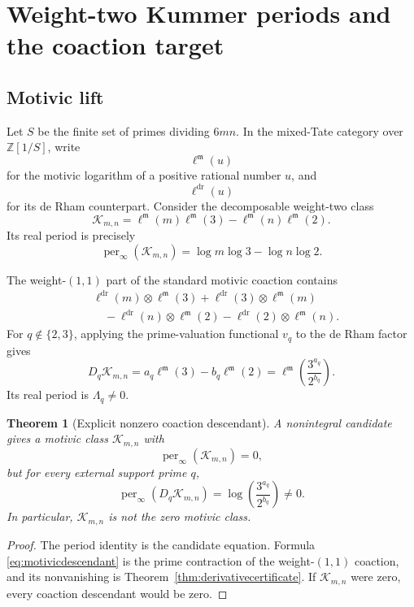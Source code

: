 \documentclass[11pt,oneside]{article}
\newtheorem{theorem}{Theorem}[section]
\theoremstyle{definition}
\newcommand{\Z}{\mathbb Z}
\newcommand{\per}{\operatorname{per}}
\begin{document}
\section{Weight-two Kummer periods and the coaction target}

\subsection{Motivic lift}

Let $S$ be the finite set of primes dividing $6mn$.  In the mixed-Tate category over $\Z[1/S]$, write
\[
  \ell^{\mathfrak m}(u)
\]
for the motivic logarithm of a positive rational number $u$, and
\[
  \ell^{\mathrm{dr}}(u)
\]
for its de Rham counterpart.  Consider the decomposable weight-two class
\begin{equation}\label{eq:motivicclass}
 \mathcal K_{m,n}
 =\ell^{\mathfrak m}(m)\ell^{\mathfrak m}(3)
  -\ell^{\mathfrak m}(n)\ell^{\mathfrak m}(2).
\end{equation}
Its real period is precisely
\[
  \per_\infty(\mathcal K_{m,n})
  =\log m\log3-\log n\log2.
\]

The weight-$(1,1)$ part of the standard motivic coaction contains
\begin{align*}
 &\ell^{\mathrm{dr}}(m)\otimes\ell^{\mathfrak m}(3)
 +\ell^{\mathrm{dr}}(3)\otimes\ell^{\mathfrak m}(m)\\
 &\quad-
 \ell^{\mathrm{dr}}(n)\otimes\ell^{\mathfrak m}(2)
 -\ell^{\mathrm{dr}}(2)\otimes\ell^{\mathfrak m}(n).
\end{align*}
For $q\notin\{2,3\}$, applying the prime-valuation functional $v_q$ to the de Rham factor gives
\begin{equation}\label{eq:motivicdescendant}
 D_q\mathcal K_{m,n}
 =a_q\ell^{\mathfrak m}(3)-b_q\ell^{\mathfrak m}(2)
 =\ell^{\mathfrak m}\!\left(\frac{3^{a_q}}{2^{b_q}}\right).
\end{equation}
Its real period is $\Lambda_q\ne0$.

\begin{theorem}[Explicit nonzero coaction descendant]
A nonintegral candidate gives a motivic class $\mathcal K_{m,n}$ with
\[
 \per_\infty(\mathcal K_{m,n})=0,
\]
but for every external support prime $q$,
\[
 \per_\infty(D_q\mathcal K_{m,n})
 =\log\!\left(\frac{3^{a_q}}{2^{b_q}}\right)\ne0.
\]
In particular, $\mathcal K_{m,n}$ is not the zero motivic class.
\end{theorem}

\begin{proof}
The period identity is the candidate equation.  Formula \eqref{eq:motivicdescendant} is the prime contraction of the weight-$(1,1)$ coaction, and its nonvanishing is Theorem~\ref{thm:derivativecertificate}.  If $\mathcal K_{m,n}$ were zero, every coaction descendant would be zero.
\end{proof}
\end{document}
